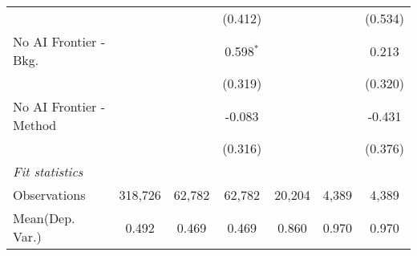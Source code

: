 \begin{tabular}{lcccccc}
                           &              &         & (0.412)     &         &            & (0.534)\\   
   No AI Frontier - Bkg.   &              &         & 0.598$^{*}$ &         &            & 0.213\\   
                           &              &         & (0.319)     &         &            & (0.320)\\   
   No AI Frontier - Method &              &         & -0.083      &         &            & -0.431\\   
                           &              &         & (0.316)     &         &            & (0.376)\\   
   \midrule
   \emph{Fit statistics}\\
   Observations            & 318,726      & 62,782  & 62,782      & 20,204  & 4,389      & 4,389\\  
Mean(Dep. Var.) & 0.492 & 0.469 & 0.469 & 0.860 & 0.970 & 0.970 \\
   

\end{tabular}
